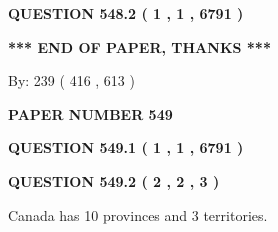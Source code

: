 \documentclass[12pt]{article}
\begin{document}
 
 
 
  
\vspace{0.2in}
  
{\textbf{\Large{QUESTION
548.2 
 ( 1 , 1 , 6791 )
}}}
  
  
   
   
 \vspace{0.2in}
 
   
   
   
   
\vspace{1.0in} 
{\textbf{\large{ *** END OF PAPER, THANKS *** }}} 
   
   
\hspace{1.0in} By: 
 239 ( 416 ,  613 )
   
   
   
   
\newpage 
\setcounter{page}{ 
   549001 } 
   
   
   
   
 {\textbf{ \Large{ PAPER NUMBER  549  }}}
   
   
\vspace{0.2in}
   
   
   
   
   
   
 \vspace{0.2in}
 
 
 
 
   
   
  
\vspace{0.2in}
  
{\textbf{\Large{QUESTION
549.1 
 ( 1 , 1 , 6791 )
}}}
  
  
  
\vspace{0.2in}
  
{\textbf{\Large{QUESTION
549.2 
 ( 2 , 2 , 3 )
}}}
  
  
 
 
\noindent{}
 
 
Canada has 10  provinces and 3 territories.
 
 
 
 
   
   
 \vspace{0.2in}
 
   
   
\end{document}
